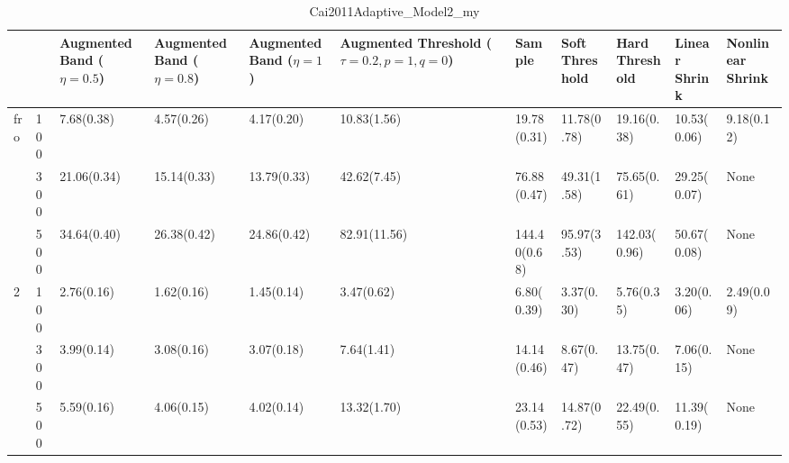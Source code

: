 \begin{table}[htbp]
\centering
\caption{Cai2011Adaptive_Model2_my}
\label{my label}
\begin{tabular}{ll|p{2cm}p{2cm}p{2cm}p{2cm}p{2cm}p{2cm}p{2cm}p{2cm}p{2cm}}
\toprule
  &     & Augmented Band ($\eta=0.5$) & Augmented Band ($\eta=0.8$) & Augmented Band ($\eta=1$) & Augmented Threshold ($\tau=0.2, p=1, q=0$) &        Sample & Soft Threshold & Hard Threshold & Linear Shrink & Nonlinear Shrink \\
\midrule
fro & 100 &                  7.68(0.38) &                  4.57(0.26) &                4.17(0.20) &                                10.83(1.56) &   19.78(0.31) &    11.78(0.78) &    19.16(0.38) &   10.53(0.06) &       9.18(0.12) \\
  & 300 &                 21.06(0.34) &                 15.14(0.33) &               13.79(0.33) &                                42.62(7.45) &   76.88(0.47) &    49.31(1.58) &    75.65(0.61) &   29.25(0.07) &             None \\
  & 500 &                 34.64(0.40) &                 26.38(0.42) &               24.86(0.42) &                               82.91(11.56) &  144.40(0.68) &    95.97(3.53) &   142.03(0.96) &   50.67(0.08) &             None \\
2 & 100 &                  2.76(0.16) &                  1.62(0.16) &                1.45(0.14) &                                 3.47(0.62) &    6.80(0.39) &     3.37(0.30) &     5.76(0.35) &    3.20(0.06) &       2.49(0.09) \\
  & 300 &                  3.99(0.14) &                  3.08(0.16) &                3.07(0.18) &                                 7.64(1.41) &   14.14(0.46) &     8.67(0.47) &    13.75(0.47) &    7.06(0.15) &             None \\
  & 500 &                  5.59(0.16) &                  4.06(0.15) &                4.02(0.14) &                                13.32(1.70) &   23.14(0.53) &    14.87(0.72) &    22.49(0.55) &   11.39(0.19) &             None \\
\bottomrule
\end{tabular}
\end{table}
